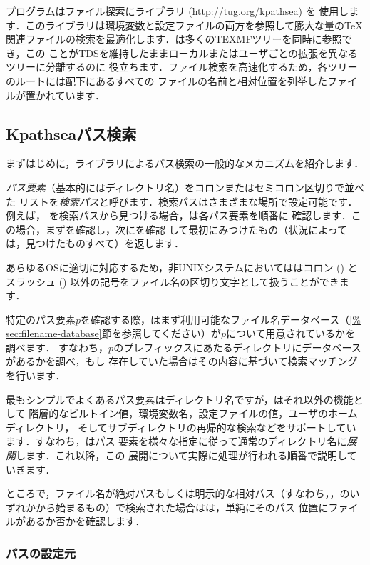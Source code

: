 \documentclass[uplatex,dvipdfmx]{jsarticle}
\begin{document}
\Webc プログラムはファイル探索に\KPS ライブラリ (\url{http://tug.org/kpathsea}) を
使用します．このライブラリは環境変数と設定ファイルの両方を参照して膨大な量の\TeX
関連ファイルの検索を最適化します．\Webc は多くのTEXMFツリーを同時に参照でき，この
ことがTDSを維持したままローカルまたはユーザごとの拡張を異なるツリーに分離するのに
役立ちます．ファイル検索を高速化するため，各ツリーのルートには配下にあるすべての
ファイルの名前と相対位置を列挙したファイルが置かれています．

\subsection{Kpathseaパス検索}
\label{sec:kpathsea}

まずはじめに，\KPS ライブラリによるパス検索の一般的なメカニズムを紹介します．

\emph{パス要素}（基本的にはディレクトリ名）をコロンまたはセミコロン区切りで並べた
リストを\emph{検索パス}と呼びます．検索パスはさまざまな場所で設定可能です．例えば，
を検索パスから見つける場合，\KPS は各パス要素を順番に
確認します．この場合，まずを確認し，次にを確認
して最初にみつけたもの（状況によっては，見つけたものすべて）を返します．

あらゆるOSに適切に対応するため，非UNIXシステムにおいては\KPS はコロン (\samp{:}) と
スラッシュ (\samp{/}) 以外の記号をファイル名の区切り文字として扱うことができます．

特定のパス要素$p$を確認する際，\KPS はまず利用可能なファイル名データベース（\ref{%
sec:filename-database}節を参照してください）が$p$について用意されているかを調べます．
すなわち，$p$のプレフィックスにあたるディレクトリにデータベースがあるかを調べ，もし
存在していた場合はその内容に基づいて検索マッチングを行います．

最もシンプルでよくあるパス要素はディレクトリ名ですが，\KPS はそれ以外の機能として
階層的なビルトイン値，環境変数名，設定ファイルの値，ユーザのホームディレクトリ，
そしてサブディレクトリの再帰的な検索などをサポートしています．すなわち，\KPS はパス
要素を様々な指定に従って通常のディレクトリ名に\emph{展開}します．これ以降，この
展開について実際に処理が行われる順番で説明していきます．

ところで，ファイル名が絶対パスもしくは明示的な相対パス（すなわち\samp{/}，，のいずれかから始まるもの）で検索された場合は\KPS は，単純にそのパス
位置にファイルがあるか否かを確認します．

\subsubsection{パスの設定元}
\label{sec:path-sources}
\end{document}
